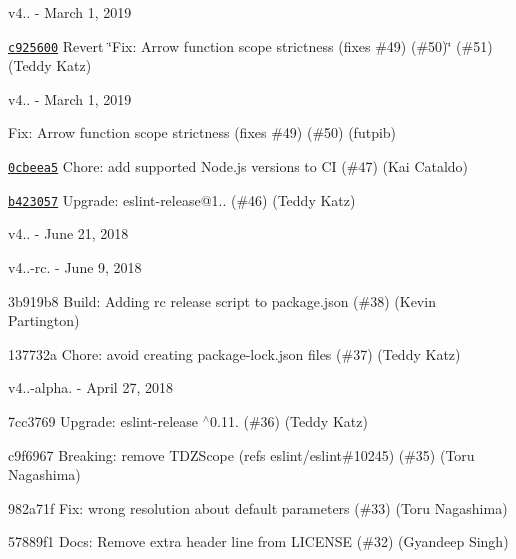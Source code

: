 v4.. -\/ March 1, 2019


\begin{DoxyItemize}
\item \href{https://github.com/eslint/eslint-scope/commit/c925600a684ae0f71b96f85339437a43b4d50d99}{\texttt{ {\ttfamily c925600}}} Revert \char`\"{}\+Fix\+: Arrow function scope strictness (fixes \#49) (\#50)\char`\"{} (\#51) (Teddy Katz)
\end{DoxyItemize}

v4.. -\/ March 1, 2019


\begin{DoxyItemize}
\item \href{https://github.com/eslint/eslint-scope/commit/2533966faf317df5a3847fab937ba462c16808b8}{\texttt{ {}}} Fix\+: Arrow function scope strictness (fixes \#49) (\#50) (futpib)
\item \href{https://github.com/eslint/eslint-scope/commit/0cbeea51dfb66ab88ea34b0e3b4ad5e6cc210f2f}{\texttt{ {\ttfamily 0cbeea5}}} Chore\+: add supported Node.\+js versions to CI (\#47) (Kai Cataldo)
\item \href{https://github.com/eslint/eslint-scope/commit/b42305760638b8edf4667acf1445e450869bd983}{\texttt{ {\ttfamily b423057}}} Upgrade\+: eslint-\/release@1.. (\#46) (Teddy Katz)
\end{DoxyItemize}

v4.. -\/ June 21, 2018

v4..-\/rc. -\/ June 9, 2018


\begin{DoxyItemize}
\item 3b919b8 Build\+: Adding rc release script to package.\+json (\#38) (Kevin Partington)
\item 137732a Chore\+: avoid creating package-\/lock.\+json files (\#37) (Teddy Katz)
\end{DoxyItemize}

v4..-\/alpha. -\/ April 27, 2018


\begin{DoxyItemize}
\item 7cc3769 Upgrade\+: eslint-\/release $^\wedge$0.11. (\#36) (Teddy Katz)
\item c9f6967 Breaking\+: remove TDZScope (refs eslint/eslint\#10245) (\#35) (Toru Nagashima)
\item 982a71f Fix\+: wrong resolution about default parameters (\#33) (Toru Nagashima)
\item 57889f1 Docs\+: Remove extra header line from LICENSE (\#32) (Gyandeep Singh)
\end{DoxyItemize}

